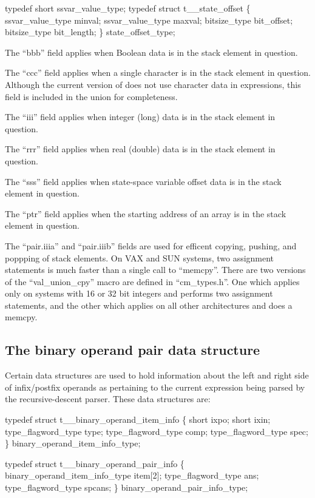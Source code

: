 \begin{codeexample}
typedef short ssvar_value_type;
typedef struct t__state_offset
   \{
      ssvar_value_type minval;
      ssvar_value_type maxval;
      bitsize_type bit_offset;
      bitsize_type bit_length;
   \} state_offset_type;
\end{codeexample}


The ``bbb'' field applies when Boolean data is in the stack element in
question.

The ``ccc'' field applies when a single character is in the stack element in
question.   Although the current version of  does not use
character data in expressions, this field is included in the union for
completeness.

The ``iii'' field applies when integer (long) data is in the stack element in
question.

The ``rrr'' field applies when real (double) data is in the stack element in
question.

The ``sss'' field applies when state-space variable offset data is in
the stack element in question.

The ``ptr'' field applies when the starting address of an array is in
the stack element in question.

The ``pair.iiia'' and ``pair.iiib'' fields are used for efficent copying,
pushing, and poppping of stack elements.   On VAX and SUN systems, two
assignment statements is much faster than a single call to ``memcpy''.
There are two versions of the ``val\_union\_cpy'' macro are defined
in ``cm\_types.h''.   One which applies only on systems with 16 or 32 bit
integers and performs two assignment statements, and the other which
applies on all other architectures and does a memcpy.

\subsection{The binary operand pair data structure}
\label{sec:bopi}

Certain data structures are used to hold information about the left and right
side of infix/postfix operands as pertaining to the current expression being
parsed by the recursive-descent parser.   These data structures are:
\begin{codeexample}
typedef struct t__binary_operand_item_info
   \{
      short ixpo;
      short ixin;
      type_flagword_type type;
      type_flagword_type comp;
      type_flagword_type spec;
   \} binary_operand_item_info_type;

typedef struct t__binary_operand_pair_info
   \{
      binary_operand_item_info_type item[2];
      type_flagword_type ans;
      type_flagword_type spcans;
   \} binary_operand_pair_info_type;
\end{codeexample}

